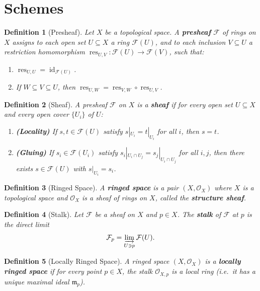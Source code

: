 \documentclass{article}
\newtheorem{definition}{Definition}
\begin{document}
\section{Schemes}

\begin{definition}[Presheaf]
Let $X$ be a topological space. A \textbf{presheaf} $\mathcal{F}$ of rings on $X$ assigns to each open set $U \subseteq X$ a ring $\mathcal{F}(U)$, and to each inclusion $V \subseteq U$ a restriction homomorphism $\operatorname{res}_{U,V} \colon \mathcal{F}(U) \to \mathcal{F}(V)$, such that:
\begin{enumerate}
    \item $\operatorname{res}_{U,U} = \operatorname{id}_{\mathcal{F}(U)}$.
    \item If $W \subseteq V \subseteq U$, then $\operatorname{res}_{U,W} = \operatorname{res}_{V,W} \circ \operatorname{res}_{U,V}$.
\end{enumerate}
\end{definition}

\begin{definition}[Sheaf]
A presheaf $\mathcal{F}$ on $X$ is a \textbf{sheaf} if for every open set $U \subseteq X$ and every open cover $\{U_i\}$ of $U$:
\begin{enumerate}
    \item \textbf{(Locality)} If $s, t \in \mathcal{F}(U)$ satisfy $s|_{U_i} = t|_{U_i}$ for all $i$, then $s = t$.
    \item \textbf{(Gluing)} If $s_i \in \mathcal{F}(U_i)$ satisfy $s_i|_{U_i \cap U_j} = s_j|_{U_i \cap U_j}$ for all $i, j$, then there exists $s \in \mathcal{F}(U)$ with $s|_{U_i} = s_i$.
\end{enumerate}
\end{definition}

\begin{definition}[Ringed Space]
A \textbf{ringed space} is a pair $(X, \mathcal{O}_X)$ where $X$ is a topological space and $\mathcal{O}_X$ is a sheaf of rings on $X$, called the \textbf{structure sheaf}.
\end{definition}

\begin{definition}[Stalk]
Let $\mathcal{F}$ be a sheaf on $X$ and $p \in X$. The \textbf{stalk} of $\mathcal{F}$ at $p$ is the direct limit
\[
    \mathcal{F}_p = \varinjlim_{U \ni p} \mathcal{F}(U).
\]
\end{definition}

\begin{definition}[Locally Ringed Space]
A ringed space $(X, \mathcal{O}_X)$ is a \textbf{locally ringed space} if for every point $p \in X$, the stalk $\mathcal{O}_{X,p}$ is a local ring (i.e.\ it has a unique maximal ideal $\mathfrak{m}_p$).
\end{definition}
\end{document}
